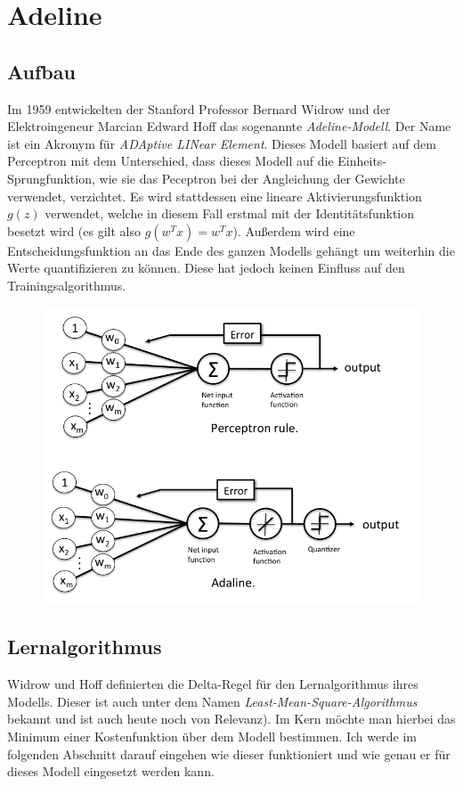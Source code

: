 
\section{Adeline} \label{sc:adel}

\subsection{Aufbau}

Im 1959 entwickelten der Stanford Professor Bernard Widrow und der Elektroingeneur Marcian Edward Hoff das sogenannte \emph{Adeline-Modell}. Der Name ist ein Akronym für \emph{ADAptive LINear Element}. Dieses Modell basiert auf dem Perceptron mit dem Unterschied, dass dieses Modell auf die Einheits-Sprungfunktion, wie sie das Peceptron bei der Angleichung der Gewichte verwendet, verzichtet. Es wird stattdessen eine lineare Aktivierungsfunktion ${g(z)}$ verwendet, welche in diesem Fall erstmal mit der Identitätsfunktion besetzt wird (es gilt also ${g(w^Tx) = w^Tx}$). Außerdem wird eine Entscheidungsfunktion an das Ende des ganzen Modells gehängt um weiterhin die Werte quantifizieren zu können. Diese hat jedoch keinen Einfluss auf den Trainingsalgorithmus. 

\begin{figure}[!htb]
	\centering
	\includegraphics[width=.8\linewidth]{img/adeline_aufbau}
	\label{fig:ad_aufbau}
\end{figure}


\subsection{Lernalgorithmus} \label{ss:la}

Widrow und Hoff definierten die Delta-Regel für den Lernalgorithmus ihres Modells. Dieser ist auch unter dem Namen \emph{Least-Mean-Square-Algorithmus} bekannt und ist auch heute noch von Relevanz). Im Kern möchte man hierbei das Minimum einer Kostenfunktion über dem Modell bestimmen. Ich werde im folgenden Abschnitt darauf eingehen wie dieser funktioniert und wie genau er für dieses Modell eingesetzt werden kann. 

